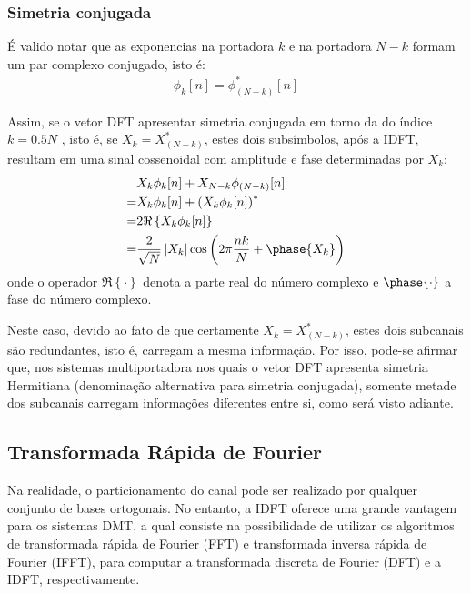 \subsubsection{Simetria conjugada}
\label{sec:simetria}

É valido notar que as exponencias na portadora $k$ e na portadora $N-k$ formam um par complexo conjugado, isto é:
\begin{align}
\phi_k[n] = \phi_{(N-k)}^{*}[n] \nonumber
\end{align}

Assim, se o vetor DFT apresentar simetria conjugada \cite{dspambardar} em torno da do índice $k=0.5N$ , isto é, se $X_k = X_{(N-k)}^*$, estes dois subsímbolos, após a IDFT, resultam em uma sinal cossenoidal com amplitude e fase determinadas por $X_k$:
\begin{align}
& X_k\phi_k[n] + X_{N-k} \phi_{(N-k)}[n] \nonumber\\ 
= & X_k \phi_k[n] + \left( X_k \phi_k[n] \right)^{*} \nonumber\\
= & 2\Re \left\{ X_k \phi_k[n] \right\} \nonumber\\
= &\frac{2}{\sqrt{N}} \left| X_k \right| \cos \left( 2\pi \frac{n k}{N} +\phase{ X_k } \right)
\end{align}
onde o operador $\Re \left\{ \cdot \right\}$ denota a parte real do número complexo e $\phase{ \cdot}$ a fase do número complexo.

Neste caso, devido ao fato de que certamente $X_k = X_{(N-k)}^{*}$, estes dois subcanais são redundantes, isto é, carregam a mesma informação. Por isso, pode-se afirmar que, nos sistemas multiportadora nos quais o vetor DFT apresenta simetria Hermitiana (denominação alternativa para simetria conjugada), somente metade dos subcanais carregam informações diferentes entre si, como será visto adiante.

\subsection{Transformada Rápida de Fourier}
\label{sec:complexidade_dft}

Na realidade, o particionamento do canal pode ser realizado por qualquer conjunto de bases ortogonais. No entanto, a IDFT oferece uma grande vantagem para os sistemas DMT, a qual consiste na possibilidade de utilizar os algoritmos de transformada rápida de Fourier (FFT) e transformada inversa rápida de Fourier (IFFT), para computar a transformada discreta de Fourier (DFT) e a IDFT, respectivamente. 

